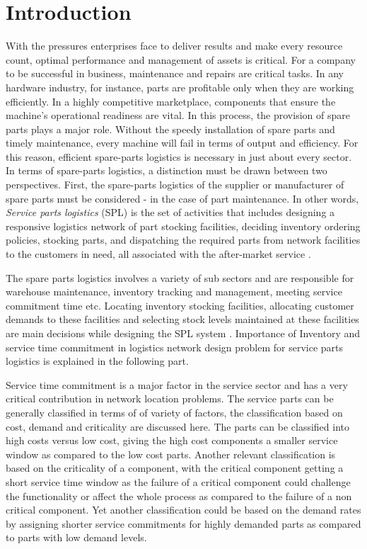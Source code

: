 \documentclass[12pt]{article}
\numberwithin{equation}{section}
\begin{document}
\section{Introduction}
With the pressures enterprises face to deliver results and make every resource count, optimal performance and management of assets is critical. For a company to be successful in business, maintenance and repairs are critical tasks. In any hardware industry, for instance, parts are profitable only when they are working efficiently. In a highly competitive marketplace, components that ensure the machine’s operational readiness are vital. In this process, the provision of spare parts plays a major role. Without the speedy installation of spare parts and timely maintenance, every machine will fail in terms of output and efficiency. For this reason, efficient spare-parts logistics is necessary in just about every sector. In terms of spare-parts logistics, a distinction must be drawn between two perspectives. First, the spare-parts logistics of the supplier or manufacturer of spare parts must be considered - in the case of part maintenance. In other words, \textit{Service parts logistics} (SPL) is the set of activities that includes designing a responsive logistics network of part stocking facilities, deciding inventory ordering policies, stocking parts, and dispatching the required parts from network facilities to the customers in need, all associated with the after-market service \cite{EK}.

The spare parts logistics involves a variety of sub sectors and are responsible for warehouse maintenance, inventory tracking and management, meeting service commitment time etc. Locating inventory stocking facilities, allocating customer demands to these facilities and selecting stock levels maintained at these facilities are main decisions while designing the SPL system \cite{EK}. Importance of Inventory and service time commitment in logistics network design problem for service parts logistics is explained in the following part.

Service time commitment is a major factor in the service sector and has a very critical contribution in network location problems. The service parts can be generally classified in terms of of variety of factors, the classification based on cost, demand and criticality are discussed here. The parts can be classified into high costs versus low cost, giving the high cost components a smaller service window as compared to the low cost parts. Another relevant classification is based on the criticality of a component, with the critical component getting a short service time window as the failure of a critical component could challenge the functionality or affect the whole process as compared to the failure of a non critical component. Yet another classification could be based on the demand rates by assigning shorter service commitments for highly demanded parts as compared to parts with low demand levels. 
\end{document}
